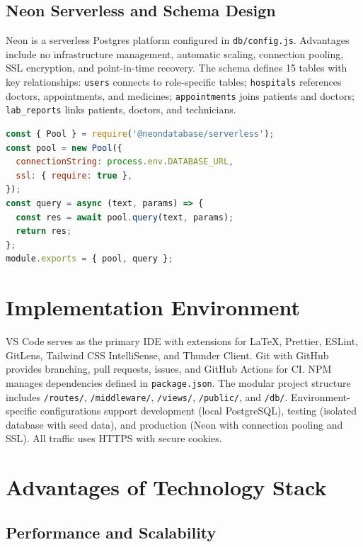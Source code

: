 \subsection{Neon Serverless and Schema Design}

\justifying
\noindent Neon is a serverless Postgres platform configured in \texttt{db/config.js}. Advantages include no infrastructure management, automatic scaling, connection pooling, SSL encryption, and point-in-time recovery. The schema defines 15 tables with key relationships: \texttt{users} connects to role-specific tables; \texttt{hospitals} references doctors, appointments, and medicines; \texttt{appointments} joins patients and doctors; \texttt{lab\_reports} links patients, doctors, and technicians.

\begin{lstlisting}[language=JavaScript, caption=Neon Database Configuration, basicstyle=\ttfamily\small, breaklines=true]
const { Pool } = require('@neondatabase/serverless');
const pool = new Pool({
  connectionString: process.env.DATABASE_URL,
  ssl: { require: true },
});
const query = async (text, params) => {
  const res = await pool.query(text, params);
  return res;
};
module.exports = { pool, query };
\end{lstlisting}

\section{Implementation Environment}

\justifying
\noindent VS Code serves as the primary IDE with extensions for LaTeX, Prettier, ESLint, GitLens, Tailwind CSS IntelliSense, and Thunder Client. Git with GitHub provides branching, pull requests, issues, and GitHub Actions for CI. NPM manages dependencies defined in \texttt{package.json}. The modular project structure includes \texttt{/routes/}, \texttt{/middleware/}, \texttt{/views/}, \texttt{/public/}, and \texttt{/db/}. Environment-specific configurations support development (local PostgreSQL), testing (isolated database with seed data), and production (Neon with connection pooling and SSL). All traffic uses HTTPS with secure cookies.

\section{Advantages of Technology Stack}

\subsection{Performance and Scalability}

